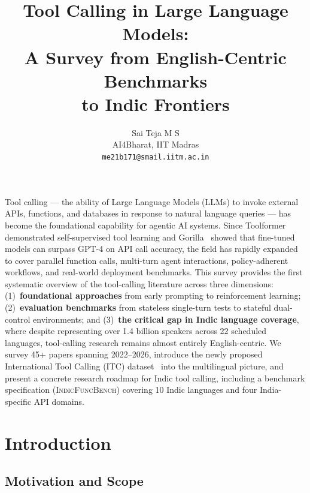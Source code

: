\documentclass[11pt]{article}
\title{%
  Tool Calling in Large Language Models:\\
  A Survey from English-Centric Benchmarks\\
  to Indic Frontiers%
}
\author{%
  Sai Teja M S\\
  AI4Bharat, IIT Madras\\
  \texttt{me21b171@smail.iitm.ac.in}
}
\begin{document}
\maketitle

\begin{abstractbox}
Tool calling --- the ability of Large Language Models (LLMs) to invoke external APIs, functions, and
databases in response to natural language queries --- has become the foundational capability for agentic
AI systems. Since Toolformer~\citep{schick2023toolformer} demonstrated self-supervised tool learning
and Gorilla~\citep{patil2023gorilla} showed that fine-tuned models can surpass GPT-4 on API call
accuracy, the field has rapidly expanded to cover parallel function calls, multi-turn agent
interactions, policy-adherent workflows, and real-world deployment benchmarks. This survey provides
the first systematic overview of the tool-calling literature across three dimensions:
(1)~\textbf{foundational approaches} from early prompting to reinforcement learning;
(2)~\textbf{evaluation benchmarks} from stateless single-turn tests to stateful dual-control
environments; and (3)~\textbf{the critical gap in Indic language coverage}, where despite representing
over 1.4 billion speakers across 22 scheduled languages, tool-calling research remains almost entirely
English-centric. We survey 45+ papers spanning 2022--2026, introduce the newly proposed International
Tool Calling (ITC) dataset~\citep{itc2025} into the multilingual picture, and present a concrete
research roadmap for Indic tool calling, including a benchmark specification
(\textsc{IndicFuncBench}) covering 10 Indic languages and four India-specific API domains.
\end{abstractbox}

\vspace{4pt}

\section{Introduction}
\label{sec:intro}

\subsection{Motivation and Scope}
\end{document}
